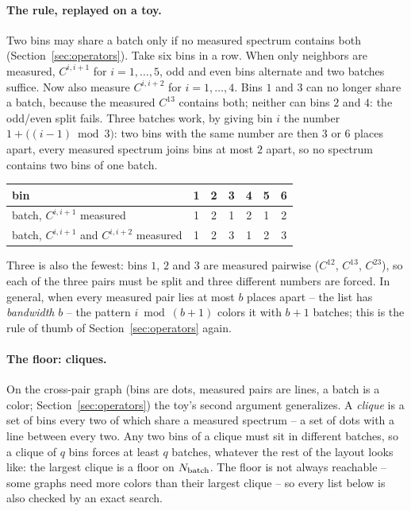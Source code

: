 \documentclass[11pt]{article}
\begin{document}
\paragraph{The rule, replayed on a toy.}
Two bins may share a batch only if no measured spectrum contains both
(Section~\ref{sec:operators}).  Take six bins in a row.  When only
neighbors are measured, $C^{i,i+1}$ for $i = 1, \ldots, 5$, odd and
even bins alternate and two batches suffice.  Now also measure
$C^{i,i+2}$ for $i = 1, \ldots, 4$.  Bins $1$ and $3$ can no longer
share a batch, because the measured $C^{13}$ contains both; neither can
bins $2$ and $4$: the odd/even split fails.  Three batches work, by
giving bin $i$ the number $1 + \bigl((i - 1) \bmod 3\bigr)$: two bins
with the same number are then $3$ or $6$ places apart, every measured
spectrum joins bins at most $2$ apart, so no spectrum contains two bins
of one batch.
\begin{center}
  \begin{tabular}{lcccccc}
    \hline
    bin & 1 & 2 & 3 & 4 & 5 & 6 \\
    \hline
    batch, $C^{i,i+1}$ measured & 1 & 2 & 1 & 2 & 1 & 2 \\
    batch, $C^{i,i+1}$ and $C^{i,i+2}$ measured & 1 & 2 & 3 & 1 & 2 & 3 \\
    \hline
  \end{tabular}
\end{center}
Three is also the fewest: bins $1$, $2$ and $3$ are measured pairwise
($C^{12}$, $C^{13}$, $C^{23}$), so each of the three pairs must be
split and three different numbers are forced.  In general, when every
measured pair lies at most $b$ places apart -- the list has
\emph{bandwidth} $b$ -- the pattern $i \bmod (b + 1)$ colors it with
$b + 1$ batches; this is the rule of thumb of
Section~\ref{sec:operators} again.

\paragraph{The floor: cliques.}
On the cross-pair graph (bins are dots, measured pairs are lines, a
batch is a color; Section~\ref{sec:operators}) the toy's second
argument generalizes.  A \emph{clique} is a set of bins every two of
which share a measured spectrum -- a set of dots with a line between
every two.  Any two bins of a clique must sit in different batches, so
a clique of $q$ bins forces at least $q$ batches, whatever the rest of
the layout looks like: the largest clique is a floor on
$N_{\rm batch}$.  The floor is not always reachable -- some graphs need
more colors than their largest clique -- so every list below is also
checked by an exact search.
\end{document}
